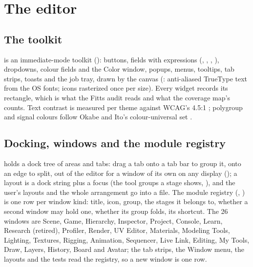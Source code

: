 \chapter{The editor}
\label{ch:editor}

\section{The toolkit}
 is an immediate-mode toolkit (): buttons, fields with expressions (,
, , ), dropdowns, colour fields and the Color window, popups, menus, tooltips,
tab strips, toasts and the job tray, drawn by the canvas (: anti-aliased TrueType text from the
OS fonts; icons rasterized once per size). Every widget records its rectangle, which is what the Fitts audit reads and
what the coverage map's  counts. Text contrast is measured per theme against WCAG's 4.5:1
\cite{W3C2018Web}; polygroup and signal colours follow Okabe and Ito's colour-universal set \cite{Okabe2008Color}.

\section{Docking, windows and the module registry}
 holds a dock tree of areas and tabs: drag a tab onto a tab bar to group it, onto an edge to
split, out of the editor for a window of its own on any display (); a layout is a dock string plus a focus
(the tool groups a stage shows, ), and the user's layouts and the whole arrangement go into a
 file. The module registry (, ) is one row per window kind: title,
icon, group, the stages it belongs to, whether a second window may hold one, whether its group folds, its shortcut.
The 26 windows are Scene, Game, Hierarchy, Inspector, Project, Console, Learn, Research (retired), Profiler, Render, UV
Editor, Materials, Modeling Tools, Lighting, Textures, Rigging, Animation, Sequencer, Live Link, Editing, My Tools,
Draw, Layers, History, Board and Avatar; the tab strips, the Window menu, the layouts and the tests read the registry,
so a new window is one row.

